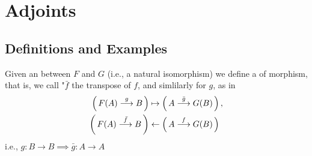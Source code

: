 \documentclass[12pt,a4paper]{report}
\newcommand{\MORPHISM}[1]{\overset{#1}\longrightarrow}
\begin{document}
\chapter{Adjoints}

\section{Definitions and Examples}

\begin{definition} 

Given an  between $F$ and $G$ (i.e., a natural isomorphism) we define a  of morphism, that is, we call "$\bar{f}$ the transpose of $f$, and simlilarly for $g$, as in 
\begin{align*}
	\PAREN{F(A) \MORPHISM{g} B}&\mapsto \PAREN{A\MORPHISM{\bar{g}}G(B)},\\
	\PAREN{F(A)\MORPHISM{\bar{f}}B} &\leftarrow \PAREN{A \MORPHISM{f}G(B)}
\end{align*}i.e., $g:B \to B \implies \bar{g}: A \to A$

\end{definition}
\end{document}
